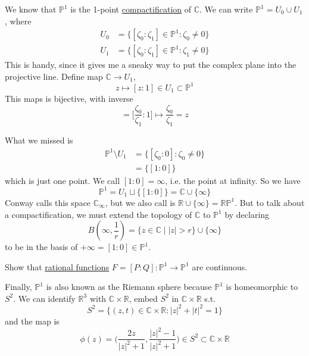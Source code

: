   We know that $\mathbb{P}^1$ is the 1-point \hyperref[pst-def:compactification-3]{compactification} of $\mathbb{C}$. We can write $\mathbb{P}^1 = U_0 \cup U_1$, where 
  \begin{align}
    U_0 & = \{[\zeta_0 : \zeta_1] \in \mathbb{P}^1 \colon \zeta_0 \neq 0 \} \\
    U_1 & = \{[\zeta_0 : \zeta_1] \in \mathbb{P}^1 \colon \zeta_1 \neq 0 \}
  \end{align}
  This is handy, since it gives me a sneaky way to put the complex plane into the projective line. Define map $\mathbb{C} \to U_1$, 
  \begin{equation}
    z \mapsto [z : 1] \in U_1 \subset \mathbb{P}^1
  \end{equation}
  This maps is bijective, with inverse 
  \begin{equation}
    [\zeta_0 : \zeta_1] = \big[ \frac{\zeta_0}{\zeta_1} : 1 \big] \mapsto \frac{\zeta_0}{\zeta_1} = z
  \end{equation}

  What we missed is 
  \begin{align}
    \mathbb{P}^1 \setminus U_1 & = \{ [\zeta_0: 0] \colon \zeta_0 \neq 0\} \\ 
                               & = \{ [1 : 0] \}
  \end{align}
  which is just one point. We call $[1 : 0] = \infty$, i.e. the point at infinity. So we have 
  \begin{equation}
    \mathbb{P}^1 = U_1 \sqcup \{[1 : 0]\}  = \mathbb{C} \cup \{\infty\}
  \end{equation}
  Conway calls this space $\mathbb{C}_{\infty}$, but we also call is $\mathbb{R} \cup \{\infty\} = \mathbb{RP}^1$. But to talk about a compactification, we must extend the topology of $\mathbb{C}$ to $\mathbb{P}^1$ by declaring 
  \begin{equation}
    B(\infty, \frac{1}{r}) = \{ z \in \mathbb{C} \mid |z| > r \} \cup \{\infty\}
  \end{equation}
  to be in the basis of $+\infty = [1 : 0] \in \mathbb{P}^1$. 

  \begin{exercise}
    Show that \hyperref[alg-def:rational-functions]{rational functions} $F = [P : Q] : \mathbb{P}^1 \to \mathbb{P}^1$ are continuous. 
  \end{exercise}

  Finally, $\mathbb{P}^1$ is also known as the Riemann sphere because $\mathbb{P}^1$ is homeomorphic to $S^2$. We can identify $\mathbb{R}^3$ with $\mathbb{C} \times \mathbb{R}$, embed $S^2$ in $\mathbb{C} \times \mathbb{R}$ s.t. 
  \begin{equation}
    S^2 = \{ (z, t) \in \mathbb{C} \times \mathbb{R} \colon |z|^2 + |t|^2 = 1 \}
  \end{equation}
  and the map is 
  \begin{equation}
    \phi(z) = \bigg( \frac{2z}{|z|^2 + 1}, \frac{|z|^2 - 1}{|z|^2 + 1} \bigg) \in S^2 \subset \mathbb{C} \times \mathbb{R}
  \end{equation}

